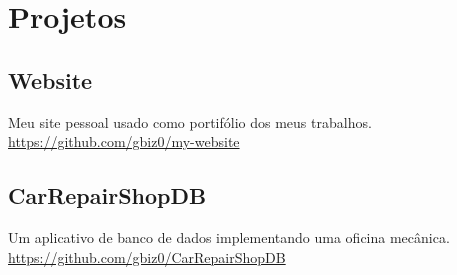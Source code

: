 \documentclass[16pt]{article}
\begin{document}
  \section{Projetos}
    \begin{minipage}[t]{0.47\linewidth}
      \subsection{Website}
        Meu site pessoal usado como portifólio dos meus trabalhos.\\

        \url{https://github.com/gbiz0/my-website}\\
    \end{minipage}
    \hfill\vline\hfill
    \begin{minipage}[t]{0.5\linewidth}
      \subsection{CarRepairShopDB}
        Um aplicativo de banco de dados implementando uma oficina mecânica.\\

        \url{https://github.com/gbiz0/CarRepairShopDB}\\

    \end{minipage}
\end{document}
